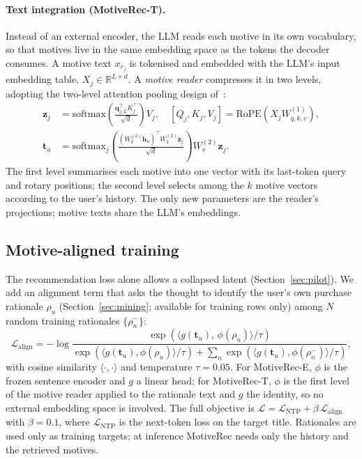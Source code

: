 \documentclass[10pt,twocolumn]{article}
\newcommand{\thought}{\mathbf{t}}
\begin{document}
\paragraph{Text integration (MotiveRec-T).} Instead of an external encoder, the LLM reads each motive in
its own vocabulary, so that motives live in the same embedding space as the tokens the decoder consumes.
A motive text $x_{r_j}$ is tokenised and embedded with the LLM's input embedding table,
$X_j\in\mathbb{R}^{L\times d}$. A \emph{motive reader} compresses it in two levels, adopting the two-level
attention pooling design of~\citet{inturec}:
\begin{align}
\mathbf{z}_j &= \mathrm{softmax}\!\left(\frac{\mathbf{q}_{j,L}^{\top}K_j^{\top}}{\sqrt d}\right)V_j,\quad
[Q_j,K_j,V_j]=\mathrm{RoPE}(X_jW^{(1)}_{q,k,v}),\\
\thought_u &= \mathrm{softmax}_j\!\left(\frac{(W^{(2)}_q\mathbf{h}_u)^{\top}W^{(2)}_k\mathbf{z}_j}{\sqrt d}\right)W^{(2)}_v\mathbf{z}_j.
\end{align}
The first level summarises each motive into one vector with its last-token query and rotary positions;
the second level selects among the $k$ motive vectors according to the user's history. The only new
parameters are the reader's projections; motive texts share the LLM's embeddings.

\subsection{Motive-aligned training}\label{sec:training}
The recommendation loss alone allows a collapsed latent (Section~\ref{sec:pilot}). We add an alignment
term that asks the thought to identify the user's own purchase rationale $\rho_u$ (Section~\ref{sec:mining};
available for training rows only) among $N$ random training rationales $\{\rho_n^-\}$:
\begin{equation}
\mathcal{L}_{\text{align}} = -\log\frac{\exp(\langle g(\thought_u),\, \phi(\rho_u)\rangle/\tau)}
{\exp(\langle g(\thought_u),\phi(\rho_u)\rangle/\tau)+\sum_{n}\exp(\langle g(\thought_u),\phi(\rho^-_n)\rangle/\tau)},
\end{equation}
with cosine similarity $\langle\cdot,\cdot\rangle$ and temperature $\tau=0.05$. For MotiveRec-E, $\phi$ is the
frozen sentence encoder and $g$ a linear head; for MotiveRec-T, $\phi$ is the first level of the motive
reader applied to the rationale text and $g$ the identity, so no external embedding space is involved.
The full objective is $\mathcal{L}=\mathcal{L}_{\text{NTP}}+\beta\,\mathcal{L}_{\text{align}}$ with
$\beta=0.1$, where $\mathcal{L}_{\text{NTP}}$ is the next-token loss on the target title. Rationales are
used only as training targets; at inference MotiveRec needs only the history and the retrieved motives.
\end{document}
